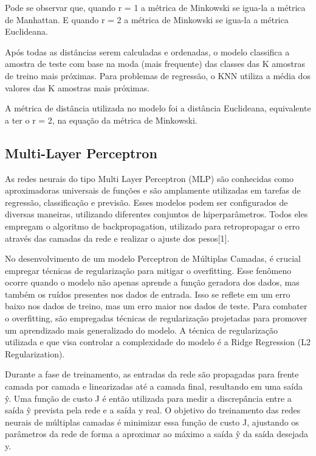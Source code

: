 \documentclass[conference]{IEEEtran}
\begin{document}
Pode se observar que, quando r = 1 a métrica de Minkowski se igua-la a métrica de Manhattan. E quando r = 2 a métrica de Minkowski se igua-la a métrica Euclideana.

Após todas as distâncias serem calculadas e ordenadas, o modelo classifica a amostra de teste com base na moda (mais frequente) das classes das K amostras de treino mais próximas. Para problemas de regressão, o KNN utiliza a média dos valores das K amostras mais próximas.

A métrica de distância utilizada no modelo foi a distância Euclideana, equivalente a ter o r = 2, na equação da métrica de Minkowski.

\subsection{Multi-Layer Perceptron}

As redes neurais do tipo Multi Layer Perceptron (MLP) são conhecidas como aproximadoras universais de funções e são amplamente utilizadas em tarefas de regressão, classificação e previsão. Esses modelos podem ser configurados de diversas maneiras, utilizando diferentes conjuntos de hiperparâmetros. Todos eles empregam o algoritmo de backpropagation, utilizado para retropropagar o erro através das camadas da rede e realizar o ajuste dos pesos[1].

No desenvolvimento de um modelo Perceptron de Múltiplas Camadas, é crucial empregar técnicas de regularização para mitigar o overfitting. Esse fenômeno ocorre quando o modelo não apenas aprende a função geradora dos dados, mas também os ruídos presentes nos dados de entrada. Isso se reflete em um erro baixo nos dados de treino, mas um erro maior nos dados de teste. Para combater o overfitting, são empregadas técnicas de regularização projetadas para promover um aprendizado mais generalizado do modelo. A técnica de regularização utilizada e que visa controlar a complexidade do modelo é a Ridge Regression (L2 Regularization).

Durante a fase de treinamento, as entradas da rede são propagadas para frente camada por camada e linearizadas até a camada final, resultando em uma saída ŷ. Uma função de custo J é então utilizada para medir a discrepância entre a saída ŷ prevista pela rede e a saída y real. O objetivo do treinamento das redes neurais de múltiplas camadas é minimizar essa função de custo J, ajustando os parâmetros da rede de forma a aproximar ao máximo a saída ŷ da saída desejada y.
\end{document}
